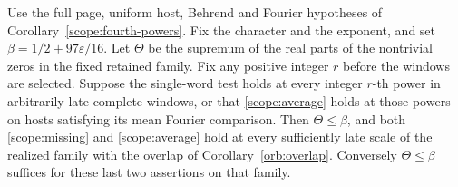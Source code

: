 \begin{proposition}\label{scope:fixed-powers}
Use the full page, uniform host, Behrend and Fourier hypotheses of
Corollary~\ref{scope:fourth-powers}. Fix the character and the exponent,
and set \(\beta=1/2+97\varepsilon/16\). Let \(\Theta\) be the supremum
of the real parts of the nontrivial zeros in the fixed retained family.
Fix any positive integer \(r\) before the windows are selected.
Suppose the single-word test holds at every integer \(r\)-th power
in arbitrarily late complete windows, or that \eqref{scope:average}
holds at those powers on hosts satisfying its mean Fourier comparison.
Then \(\Theta\le\beta\), and both
\eqref{scope:missing} and \eqref{scope:average} hold at every
sufficiently late scale of the realized family with the overlap of
Corollary~\ref{orb:overlap}. Conversely \(\Theta\le\beta\) suffices for
these last two assertions on that family.
\end{proposition}
